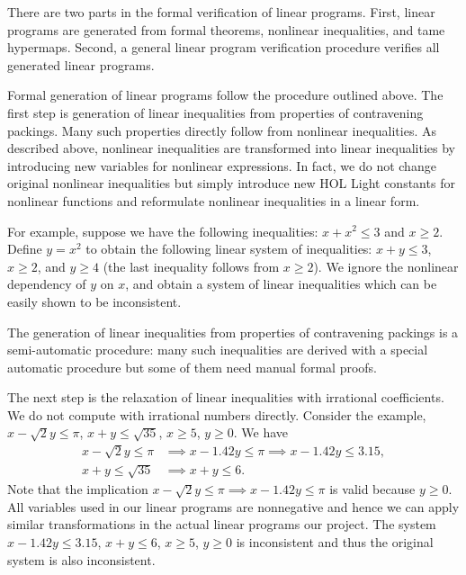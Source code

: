 There are two parts in the formal verification of linear
programs. First, linear programs are generated from formal theorems,
nonlinear inequalities, and tame hypermaps. Second, a general linear
program verification procedure verifies all generated linear programs.

Formal generation of linear programs follow the procedure outlined
above. The first step is generation of linear inequalities from
properties of contravening packings. Many such properties directly
follow from nonlinear inequalities. As described above, nonlinear
inequalities are transformed into linear inequalities by introducing
new variables for nonlinear expressions. In fact, we do not change
original nonlinear inequalities but simply introduce new HOL Light
constants for nonlinear functions and reformulate nonlinear inequalities
in a linear form.

For example, suppose we have the following inequalities: $x +
x^2 \le 3$ and $x \ge 2$. Define $y = x^2$ to obtain the following
linear system of inequalities: $x + y \le 3$, $x \ge 2$, and $y \ge 4$
(the last inequality follows from $x \ge 2$).  We
ignore the nonlinear dependency of $y$ on $x$, and obtain a system of linear
inequalities which can be easily shown to be inconsistent.

The generation of linear inequalities from properties of contravening packings is
a semi-automatic procedure: many such inequalities are derived with a special
automatic procedure but some of them need manual formal proofs.

The next step is the relaxation of linear inequalities with irrational
coefficients. We do not compute with
irrational numbers directly.  Consider the example, $x - \sqrt{2} y \le
\pi$, $x + y \le \sqrt{35}$, $x \ge 5$, $y \ge 0$. We have
\begin{equation*}
\begin{split}
x - \sqrt{2} y \le \pi &\implies x - 1.42 y \le \pi \implies x - 1.42 y \le 3.15,\\
x + y \le \sqrt{35} &\implies x + y \le 6.
\end{split}
\end{equation*}
Note that the implication $x - \sqrt{2} y \le \pi \implies x - 1.42 y
\le \pi$ is valid because $y \ge 0$. All variables used in our linear
programs  are nonnegative and hence we can apply similar
transformations in the actual linear programs our project. The system
$x - 1.42 y \le 3.15$, $x + y \le 6$, $x \ge 5$, $y \ge 0$ is
inconsistent and thus the original system is also inconsistent.

